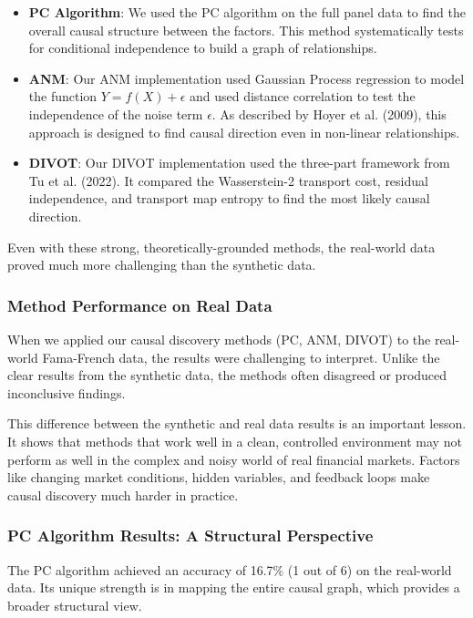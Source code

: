 \begin{itemize}
    \item \textbf{PC Algorithm}: We used the PC algorithm on the full panel data to find the overall causal structure between the factors. This method systematically tests for conditional independence to build a graph of relationships.
    \item \textbf{ANM}: Our ANM implementation used Gaussian Process regression to model the function $Y = f(X) + \epsilon$ and used distance correlation to test the independence of the noise term $\epsilon$. As described by Hoyer et al. (2009), this approach is designed to find causal direction even in non-linear relationships\cite{Hoyer09}.
    \item \textbf{DIVOT}: Our DIVOT implementation used the three-part framework from Tu et al. (2022)\cite{Tu22}. It compared the Wasserstein-2 transport cost, residual independence, and transport map entropy to find the most likely causal direction.
\end{itemize}

Even with these strong, theoretically-grounded methods, the real-world data proved much more challenging than the synthetic data.

\subsubsection{Method Performance on Real Data}

When we applied our causal discovery methods (PC, ANM, DIVOT) to the real-world Fama-French data, the results were challenging to interpret. Unlike the clear results from the synthetic data, the methods often disagreed or produced inconclusive findings.

This difference between the synthetic and real data results is an important lesson. It shows that methods that work well in a clean, controlled environment may not perform as well in the complex and noisy world of real financial markets. Factors like changing market conditions, hidden variables, and feedback loops make causal discovery much harder in practice.

\subsubsection{PC Algorithm Results: A Structural Perspective}
The PC algorithm achieved an accuracy of 16.7\% (1 out of 6) on the real-world data. Its unique strength is in mapping the entire causal graph, which provides a broader structural view.

